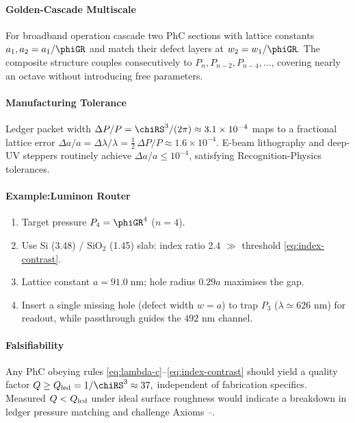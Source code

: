 \documentclass[11pt,oneside]{book}
\begin{document}
{\paragraph{Golden-Cascade Multiscale}

For broadband operation cascade two PhC sections with lattice
constants
\(
   a_{1},a_{2}=a_{1}/\phiGR
   \)
and match their defect layers at
\(
   w_{2}=w_{1}/\phiGR.
   \)
The composite structure couples consecutively to
\(
   P_{n},P_{n\!-\!2},P_{n\!-\!4},\dots
\),
covering nearly an octave without introducing free parameters.

\paragraph{Manufacturing Tolerance}

Ledger packet width
\(
   \Delta P/P = \chiRS^{3}/(2\pi)\approx3.1\times10^{-4}
\)
maps to a fractional lattice error
\(
   \Delta a/a = \Delta\lambda/\lambda
               = \tfrac12\,\Delta P/P
               \approx1.6\times10^{-4}.
\)
E-beam lithography and deep-UV steppers routinely achieve
\(
   \Delta a/a\!\le\!10^{-4}
\),
satisfying Recognition-Physics tolerances.

\paragraph*{Example:\;Luminon Router}

\begin{enumerate}\setlength\itemsep{3pt}
\item Target pressure \(P_{4}=\phiGR^{4}\) ($n=4$).  
\item Use Si (3.48) / SiO$_2$ (1.45) slab: index ratio 2.4
      $\gg$ threshold \eqref{eq:index-contrast}.
\item Lattice constant
      \(a=91.0\;\text{nm}\); hole radius $0.29a$ maximises the gap.
\item Insert a single missing hole (defect width $w=a$)
      to trap \(P_{3}\) ($\lambda\simeq626$ nm) for readout,
      while passthrough guides the \(492\) nm channel.
\end{enumerate}

\paragraph*{Falsifiability}

Any PhC obeying rules
\eqref{eq:lambda-c}–\eqref{eq:index-contrast}
should yield a quality factor
\(
   Q\ge Q_{\rm led}=1/\chiRS^{3}\approx37,
\)
independent of fabrication specifics.
Measured $Q<Q_{\rm led}$ under ideal surface roughness would indicate
a breakdown in ledger pressure matching and challenge
Axioms –.

}
\end{document}
